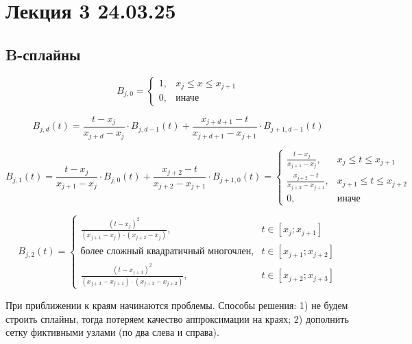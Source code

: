 \section{Лекция 3 24.03.25}

\subsection{B-сплайны}

\begin{equation}
    B_{j,0} = \begin{cases}  
        1, & x_j \leq x \leq x_{j+1} \\
        0, & \text{иначе}
    \end{cases}
\end{equation}

\begin{equation}
    B_{j,d}(t) = \frac{t - x_j}{x_{j+d} - x_j} \cdot B_{j, d-1}(t) + 
    \frac{x_{j+d+1} - t}{x_{j+d+1} - x_{j+1}} \cdot B_{j+1, d-1}(t)
\end{equation}

\begin{equation}
    B_{j,1}(t) = \frac{t - x_j}{x_{j+1} - x_j} \cdot B_{j, 0}(t) +
        \frac{x_{j+2} - t}{x_{j+2} - x_{j+1}} \cdot B_{j+1, 0}(t) = \begin{cases}
        \frac{t - x_j}{x_{j+1} - x_j}, & x_j \leq t \leq x_{j+1}\\
        \frac{x_{j+2} - t}{x_{j+2} - x_{j+1}}, & x_{j+1} \leq t \leq x_{j+2}\\
        0, & \text{иначе}
    \end{cases}
\end{equation}

\begin{equation}
    B_{j,2}(t) = \begin{cases}
        \frac{(t - x_j)^2}{(x_{j+1} - x_j) \cdot (x_{j+2} - x_j)}, & t \in [x_j; x_{j+1}]\\
        \text{более сложный квадратичный многочлен}, & t \in [x_{j+1}; x_{j+2}]\\
        \frac{(t - x_{j+3})^2}{(x_{j+3} - x_{j+1}) \cdot (x_{j+3} - x_{j+2})}, & t \in [x_{j+2}; x_{j+3}]
    \end{cases}
\end{equation}

При приближении к краям начинаются проблемы. Способы решения: 1) не будем строить сплайны, тогда потеряем качество аппроксимации на краях; 2) дополнить сетку фиктивными узлами (по два слева и справа).

